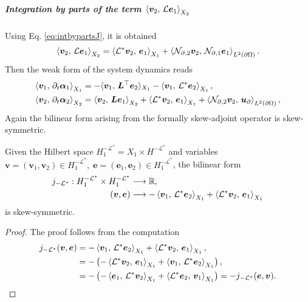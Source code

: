 \subparagraph{Integration by parts of the term $\inner[X_2]{\bm{v}_2}{\mathcal{L}\bm{e}_1}$}
Using Eq. \eqref{eq:intbypartsJ}, it is obtained 
\begin{equation}
\inner[X_2]{\bm{v}_2}{\mathcal{L}\bm{e}_1} = \inner[X_1]{\mathcal{L}^*\bm{v}_2}{\bm{e}_1} + \inner[L^2(\partial \Omega)]{\mathcal{N}_{\partial, 2} \bm{v}_2}{\mathcal{N}_{\partial, 1} \bm{e}_1}.
\end{equation}
Then the weak form of the system dynamics  reads 
\begin{equation}\label{eq:weak_dyn_intJ2}
\begin{aligned}
\inner[X_1]{\bm{v}_1}{\partial_t \bm{\alpha}_1} &=   -  \langle{\bm{v}_1}, \,{\bm{L}^\top \bm{e}_2}\rangle_{X_1}  -\inner[X_1]{\bm{v}_1}{\mathcal{L}^*\bm{e}_2}, \\
\inner[X_2]{\bm{v}_2}{\partial_t \bm{\alpha}_2} &=   \inner[X_2]{\bm{v}_2}{\bm{L}\bm{e}_1}  + \inner[X_1]{\mathcal{L}^*\bm{v}_2}{\bm{e}_1} + \inner[L^2(\partial \Omega)]{\mathcal{N}_{\partial, 2} \bm{v}_2}{\bm{u}_{\partial}}, \\
\end{aligned}
\end{equation}
Again the bilinear form arising from the formally skew-adjoint operator is skew-symmetric.
\begin{proposition}
	Given the Hilbert space $H^{-\mathcal{L}^*}_1 = X_1 \times H^{-\mathcal{L}^*}$ and variables $\bm{v} = (\bm{v}_1, \bm{v}_2) \in H^{-\mathcal{L}^*}_1, \; \bm{e} = (\bm{e}_1, \bm{e}_2) \in H^{-\mathcal{L}^*}_1$, the bilinear form 
	\begin{equation*}
	\begin{aligned}
	j_{-\mathcal{L}^*}: H^{-\mathcal{L}^*}_1 \times H^{-\mathcal{L}^*}_1 &\longrightarrow \mathbb{R}, \\
	(\bm{v}, \bm{e}) &\longrightarrow -\inner[X_1]{\bm{v}_1}{\mathcal{L}^*\bm{e}_2} + \inner[X_1]{\mathcal{L}^*\bm{v}_2}{\bm{e}_1}
	\end{aligned}
	\end{equation*}
	is skew-symmetric.
	\begin{proof}
		The proof follows from the computation
		\begin{equation*}
		\begin{aligned}
		j_{-\mathcal{L}^*}(\bm{v}, \bm{e}) &= -\inner[X_1]{\bm{v}_1}{\mathcal{L}^*\bm{e}_2} + \inner[X_1]{\mathcal{L}^*\bm{v}_2}{\bm{e}_1}, \\
		&= - \left(-\inner[X_1]{\mathcal{L}^*\bm{v}_2}{\bm{e}_1} + \inner[X_1]{\bm{v}_1}{\mathcal{L}^*\bm{e}_2}\right), \\
		&= - \left(-\inner[X_1]{\bm{e}_1}{\mathcal{L}^*\bm{v}_2} + \inner[X_1]{\mathcal{L}^*\bm{e}_2}{\bm{v}_1}\right) = - j_{-\mathcal{L}^*}(\bm{e}, \bm{v}).
		\end{aligned}
		\end{equation*}
	\end{proof}
\end{proposition}

